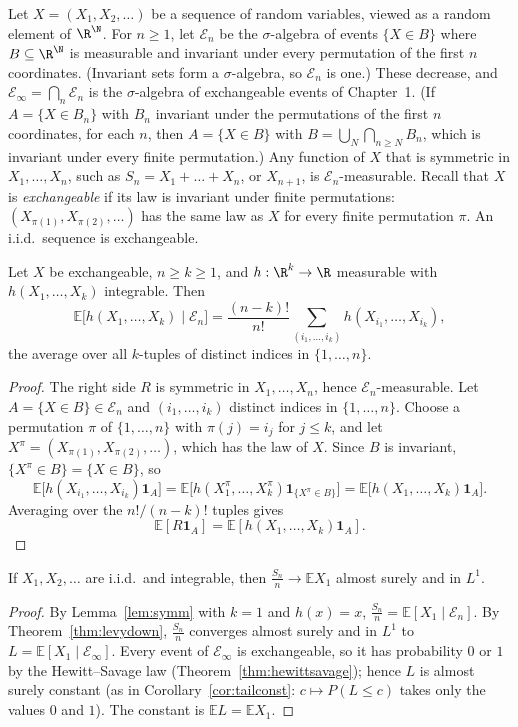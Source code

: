 Let $X=(X_1,X_2,\dots)$ be a sequence of random variables, viewed as a random element of $\R^\N$. For $n\ge1$, let $\mathcal E_n$ be the $\sigma$-algebra of events $\{X\in B\}$ where $B\subseteq\R^\N$ is
measurable and invariant under every permutation of the first $n$ coordinates. (Invariant sets form a $\sigma$-algebra, so $\mathcal E_n$ is one.) These decrease, and $\mathcal E_\infty=\bigcap_n\mathcal E_n$ is
the $\sigma$-algebra of exchangeable events of Chapter~1. (If $A=\{X\in B_n\}$ with $B_n$ invariant under the permutations of the first $n$ coordinates, for each $n$, then $A=\{X\in B\}$ with $B=\bigcup_N\bigcap_{n\ge N}B_n$, which is invariant under every finite permutation.) Any function of $X$ that is symmetric in $X_1,\dots,X_n$, such as $S_n=X_1+\dots+X_n$, or $X_{n+1}$, is $\mathcal E_n$-measurable.
Recall that $X$ is \emph{exchangeable} if its law is invariant under finite permutations: $(X_{\pi(1)},X_{\pi(2)},\dots)$ has the same law as $X$ for every finite permutation $\pi$. An i.i.d.\ sequence is exchangeable.

\begin{lemma}[symmetrization]\label{lem:symm}
Let $X$ be exchangeable, $n\ge k\ge1$, and $h:\R^k\to\R$ measurable with $h(X_1,\dots,X_k)$ integrable. Then
\[
\mathbb E\bigl[h(X_1,\dots,X_k)\mid\mathcal E_n\bigr]=\frac{(n-k)!}{n!}\sum_{(i_1,\dots,i_k)}h(X_{i_1},\dots,X_{i_k}),
\]
the average over all $k$-tuples of distinct indices in $\{1,\dots,n\}$.
\end{lemma}
\begin{proof}
The right side $R$ is symmetric in $X_1,\dots,X_n$, hence $\mathcal E_n$-measurable. Let $A=\{X\in B\}\in\mathcal E_n$ and $(i_1,\dots,i_k)$ distinct indices in $\{1,\dots,n\}$. Choose a permutation $\pi$ of $\{1,\dots,n\}$ with
$\pi(j)=i_j$ for $j\le k$, and let $X^\pi=(X_{\pi(1)},X_{\pi(2)},\dots)$, which has the law of $X$. Since $B$ is invariant, $\{X^\pi\in B\}=\{X\in B\}$, so
\[
\mathbb E\bigl[h(X_{i_1},\dots,X_{i_k})\mathbf 1_A\bigr]=\mathbb E\bigl[h(X^\pi_1,\dots,X^\pi_k)\mathbf 1_{\{X^\pi\in B\}}\bigr]=\mathbb E\bigl[h(X_1,\dots,X_k)\mathbf 1_A\bigr].
\]
Averaging over the $n!/(n-k)!$ tuples gives
\[
\mathbb E[R\mathbf 1_A]=\mathbb E[h(X_1,\dots,X_k)\mathbf 1_A].
\]
\end{proof}

\begin{theorem}\label{thm:slllnback}
If $X_1,X_2,\dots$ are i.i.d.\ and integrable, then $\frac{S_n}n\to\mathbb EX_1$ almost surely and in $L^1$.
\end{theorem}
\begin{proof}
By Lemma~\ref{lem:symm} with $k=1$ and $h(x)=x$, $\frac{S_n}n=\mathbb E[X_1\mid\mathcal E_n]$. By Theorem~\ref{thm:levydown}, $\frac{S_n}n$ converges almost surely and in $L^1$ to
$L=\mathbb E[X_1\mid\mathcal E_\infty]$. Every event of $\mathcal E_\infty$ is exchangeable, so it has probability $0$ or $1$ by the Hewitt--Savage law (Theorem~\ref{thm:hewittsavage}); hence $L$ is almost surely
constant (as in Corollary~\ref{cor:tailconst}: $c\mapsto P(L\le c)$ takes only the values $0$ and $1$). The constant is $\mathbb EL=\mathbb EX_1$.
\end{proof}

